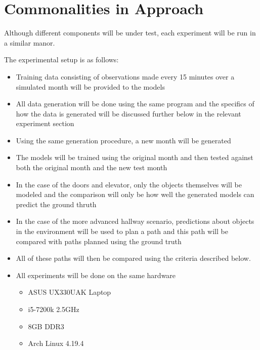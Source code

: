   \section{ Commonalities in Approach }
  Although different components will be under test, each experiment will be run
  in a similar manor.

  The experimental setup is as follows:

  \begin{itemize}

    \item Training data consisting of observations made every 15 minutes over
          a simulated month will be provided to the models

    \item All data generation will be done using the same program and the
          specifics of how the data is generated will be discussed further
          below in the relevant experiment section

    \item Using the same generation procedure, a new month will be generated

    \item The models will be trained using the original month and then tested
          against both the original month and the new test month

    \item In the case of the doors and elevator, only the objects themselves
          will be modeled and the comparison will only be how well the generated
          models can predict the ground thruth

    \item In the case of the more advanced hallway scenario, predictions about
          objects in the environment will be used to plan a path and this path
          will be compared with paths planned using the ground truth

    \item All of these paths will then be compared using the criteria described
          below.

    \item All experiments will be done on the same hardware
      \begin{itemize}
        \item ASUS UX330UAK Laptop
        \item i5-7200k 2.5GHz
        \item 8GB DDR3
        \item Arch Linux 4.19.4
      \end{itemize}

  \end{itemize}

